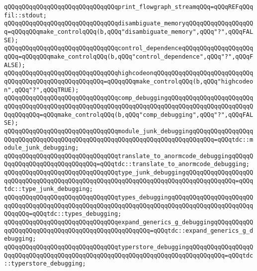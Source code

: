\newline
\verb|qQQqqQQqqQQqqQQqqQQqqQQqqQQqqQQqprint_flowgraph_streamqQQq=qQQqREFqQQqfil::stdout;|\newline
\newline
\verb|qQQqqQQqqQQqqQQqqQQqqQQqqQQqqQQqdisambiguate_memoryqQQqqQQqqQQqqQQqqQQq=qQQqqQQqmake_controlqQQq(b,qQQq"disambiguate_memory",qQQq"?",qQQqFALSE);|\newline
\verb|qQQqqQQqqQQqqQQqqQQqqQQqqQQqqQQqcontrol_dependenceqQQqqQQqqQQqqQQqqQQqqQQq=qQQqqQQqmake_controlqQQq(b,qQQq"control_dependence",qQQq"?",qQQqFALSE);|\newline
\verb|qQQqqQQqqQQqqQQqqQQqqQQqqQQqqQQqhighcodeonqQQqqQQqqQQqqQQqqQQqqQQqqQQqqQQqqQQqqQQqqQQqqQQqqQQqqQQq=qQQqqQQqmake_controlqQQq(b,qQQq"highcodeon",qQQq"?",qQQqTRUE);|\newline
\newline
\verb|qQQqqQQqqQQqqQQqqQQqqQQqqQQqqQQqcomp_debuggingqQQqqQQqqQQqqQQqqQQqqQQqqQQqqQQqqQQqqQQqqQQqqQQqqQQqqQQqqQQqqQQqqQQqqQQqqQQqqQQqqQQqqQQqqQQqqQQqqQQqqQQq=qQQqmake_controlqQQq(b,qQQq"comp_debugging",qQQq"?",qQQqFALSE);|\newline
\newline
\verb|qQQqqQQqqQQqqQQqqQQqqQQqqQQqqQQqmodule_junk_debuggingqQQqqQQqqQQqqQQqqQQqqQQqqQQqqQQqqQQqqQQqqQQqqQQqqQQqqQQqqQQqqQQqqQQqqQQqqQQq=qQQqtdc::module_junk_debugging;|\newline
\verb|qQQqqQQqqQQqqQQqqQQqqQQqqQQqqQQqtranslate_to_anormcode_debuggingqQQqqQQqqQQqqQQqqQQqqQQqqQQqqQQq=qQQqtdc::translate_to_anormcode_debugging;|\newline
\verb|qQQqqQQqqQQqqQQqqQQqqQQqqQQqqQQqtype_junk_debuggingqQQqqQQqqQQqqQQqqQQqqQQqqQQqqQQqqQQqqQQqqQQqqQQqqQQqqQQqqQQqqQQqqQQqqQQqqQQqqQQqqQQq=qQQqtdc::type_junk_debugging;|\newline
\newline
\verb|qQQqqQQqqQQqqQQqqQQqqQQqqQQqqQQqtypes_debuggingqQQqqQQqqQQqqQQqqQQqqQQqqQQqqQQqqQQqqQQqqQQqqQQqqQQqqQQqqQQqqQQqqQQqqQQqqQQqqQQqqQQqqQQqqQQqqQQqqQQq=qQQqtdc::types_debugging;|\newline
\verb|qQQqqQQqqQQqqQQqqQQqqQQqqQQqqQQqexpand_generics_g_debuggingqQQqqQQqqQQqqQQqqQQqqQQqqQQqqQQqqQQqqQQqqQQqqQQqqQQq=qQQqtdc::expand_generics_g_debugging;|\newline
\verb|qQQqqQQqqQQqqQQqqQQqqQQqqQQqqQQqtyperstore_debuggingqQQqqQQqqQQqqQQqqQQqqQQqqQQqqQQqqQQqqQQqqQQqqQQqqQQqqQQqqQQqqQQqqQQqqQQqqQQqqQQq=qQQqtdc::typerstore_debugging;|\newline
\newline

